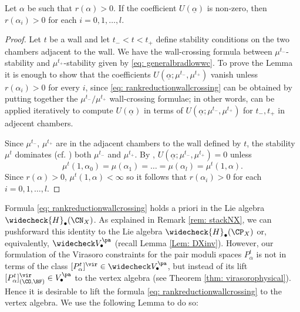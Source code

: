 \begin{lemma}
\notready\label{lem: norank0}
Let $\alpha$ be such that $r(\alpha)>0$. If the coefficient $U(\underline{\alpha})$ is non-zero, then $r(\alpha_i)>0$ for each $i=0, 1, \ldots, l$.
\end{lemma}
\begin{proof}
Let $t$ be a wall and let $t_-<t<t_+$ define stability conditions on the two chambers adjacent to the wall. We have the wall-crossing formula between $\mu^{t_-}$-stability and $\mu^{t_+}$-stability given by \eqref{eq: generalbradlowwc}. To prove the Lemma it is enough to show that the coefficients $U(\underline{\alpha}; \mu^{t_-}, \mu^{t_+})$ vanish unless $r(\alpha_i)> 0$ for every $i$, since \eqref{eq: rankreductionwallcrossing} can be obtained by putting together the $\mu^{t_-}/\mu^{t_+}$ wall-crossing formulae; in other words, \cite[Theorem 3.11]{Jo21} can be applied iteratively to compute $U(\underline{\alpha})$ in terms of $U(\underline{\alpha}; \mu^{t_-}, \mu^{t_+})$ for $t_-, t_+$ in adjecent chambers.

Since $\mu^{t_-}$, $\mu^{t_+}$ are in the adjacent chambers to the wall defined by $t$, the stability $\mu^t$ dominates (cf. \cite[Definition 3.8]{Jo21}) both $\mu^{t_-}$ and $\mu^{t_+}$. By \cite[Theorem 3.11]{Jo21}, $U(\underline{\alpha}; \mu^{t_-}, \mu^{t_+})=0$ unless
\[\mu^t(1, \alpha_0)=\mu(\alpha_1)=\ldots=\mu(\alpha_l)=\mu^t(1, \alpha).\]
Since $r(\alpha)>0$, $\mu^t(1, \alpha)<\infty$ so it follows that $r(\alpha_i)>0$ for each $i=0, 1, \ldots, l$. \qedhere
\end{proof}

Formula \eqref{eq: rankreductionwallcrossing} holds a priori in the Lie algebra $\widecheck{H}_\bullet(\CN_X)$. As explained in Remark \ref{rem: stackNX}, we can pushforward this identity to the Lie algebra $\widecheck{H}_\bullet(\CP_X)$ or, equivalently, $\widecheck V_\bullet^{\pa}$ (recall Lemma \ref{Lem: DXinv}). However, our formulation of the Virasoro constraints for the pair moduli spaces $P_\alpha^t$ is not in terms of the class $[P_\alpha^t]^\vir\in \widecheck V_\bullet^{\pa}$, but instead of its lift $[P_\alpha^t]^\vir_{(\CO,\BF)}\in V_\bullet^{\pa}$ to the vertex algebra (see Theorem \ref{thm: virasorophysical}). Hence it is desirable to lift the formula \eqref{eq: rankreductionwallcrossing} to the vertex algebra. We use the following Lemma to do so:

